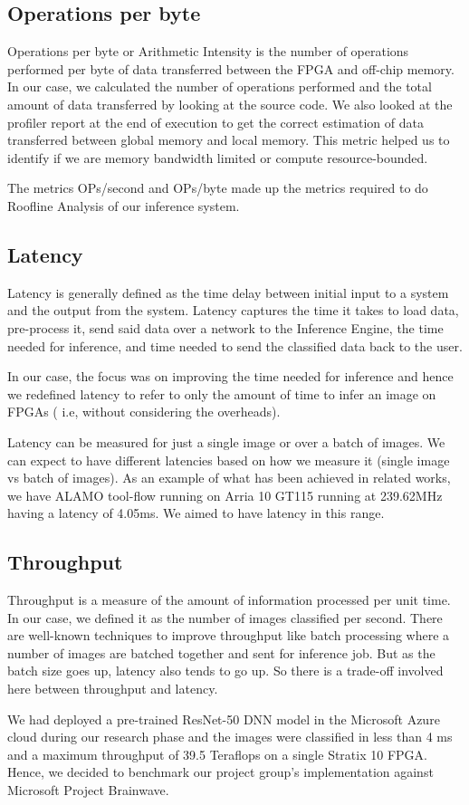 \subsection{Operations per byte}
Operations per byte or Arithmetic Intensity is the number of operations performed per byte of data transferred between the FPGA and off-chip memory.  
In our case, we calculated the number of operations performed and the total amount of data transferred by looking at the source code. We also looked at the profiler report at the end of execution to get the correct estimation of data transferred between global memory and local memory.  
This metric helped us to identify if we are memory bandwidth limited or compute resource-bounded.  

The metrics OPs/second and OPs/byte made up the metrics required to do Roofline Analysis of our inference system.  


\subsection{Latency}
Latency is generally defined as the time delay between initial input to a system and the output from the system. Latency captures the time it takes to load data, pre-process it, send said data over a network to the Inference Engine, the time needed for inference, and time needed to send the classified data back to the user. 

In our case, the focus was on improving the time needed for inference and hence we redefined latency to refer to only the amount of time to infer an image on FPGAs ( i.e, without considering the overheads).

Latency can be measured for just a single image or over a batch of images. We can expect to have different latencies based on how we measure it (single image vs batch of images). As an example of what has been achieved in related works, we have ALAMO tool-flow running on Arria 10 GT115 running at 239.62MHz having a latency of 4.05ms.
We aimed to have latency in this range.

\subsection{Throughput}
Throughput is a measure of the amount of information processed per unit time. In our case, we defined it as the number of images classified per second. There are well-known techniques to improve throughput like batch processing where a number of images are batched together and sent for inference job. 
But as the batch size goes up, latency also tends to go up. So there is a trade-off involved here between throughput and latency.  \par
We had deployed a pre-trained ResNet-50 DNN model in the Microsoft Azure cloud during our research phase and the images were classified in less than 4 ms and a maximum throughput of 39.5 Teraflops on a single Stratix 10 FPGA. Hence, we decided to benchmark our project group's implementation against Microsoft Project Brainwave.



